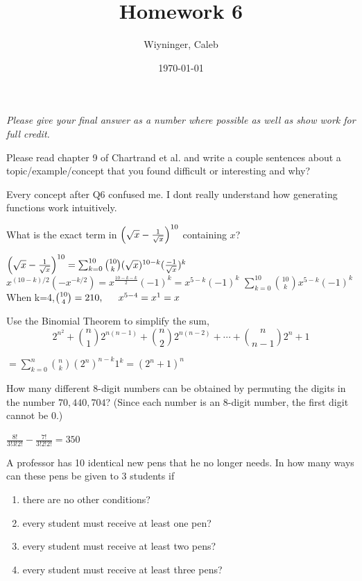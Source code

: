 \documentclass{homework}
\author{Wiyninger, Caleb}  %
\date{\today}  %
\title{Homework 6}
\begin{document}
 \maketitle

\textit{Please give your final answer as a number where possible as well as show work for full credit.}

\question Please read chapter 9 of Chartrand et al. and write a couple sentences about a topic/example/concept that you found difficult or interesting and why?

\begin{sol}
  Every concept after Q6 confused me. I dont really understand how generating functions work intuitively. 
\end{sol}

\question{\label{q16}} What is the exact term in $\left(\sqrt{x} - \frac{1}{\sqrt{x}}\right)^{10}$ containing $x$?

\begin{sol}
  $\left(\sqrt{x} - \frac{1}{\sqrt{x}}\right)^{10}=\sum_{k=0}^{10}\binom{10}{k}(\sqrt{x})^{10-k}(\frac{-1}{\sqrt{x}})^k$
  \newline
  $x^{(10-k)/2}(-x^{-k/2})=x^{\frac{10-k-k}{2}}(-1)^k=x^{5-k}(-1)^k$
  \newline
  $\sum_{k=0}^{10}\binom{10}{k}x^{5-k}(-1)^k$
  \newline
  When k=4,$\binom{10}{4}=210, \indent  x^{5-4}=x^1=x$
\end{sol}

\question Use the Binomial Theorem to simplify the sum,
\[
    2^{n^2} + \binom{n}{1}2^{n(n-1)} + \binom{n}{2}2^{n(n-2)} + \cdots + \binom{n}{n-1}2^n + 1
\]
\begin{sol}
  $=\sum_{k=0}^{n}\binom{n}{k}(2^n)^{n-k}1^k=(2^n+1)^n$
\end{sol}

\question How many different 8-digit numbers can be obtained by permuting the digits in the number $70,440,704$? (Since each number is an 8-digit number, the first digit cannot be 0.)

\begin{sol}
  $\frac{8!}{3!3!2!}-\frac{7!}{3!2!2!}=350$
\end{sol}

\question A professor has 10 identical new pens that he no longer needs. In how many ways can these pens be given to 3 students if
\begin{enumerate}[label=(\alph*)]
    \item there are no other conditions?
    \item every student must receive at least one pen?
    \item every student must receive at least two pens?
    \item every student must receive at least three pens?
\end{enumerate}
\end{document}
